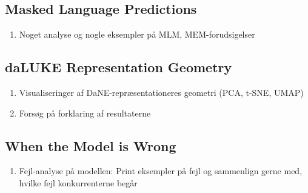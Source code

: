 \documentclass[main.tex]{subfiles}
\begin{document}
\subsection{Masked Language Predictions}
\begin{enumerate}
    \item Noget analyse og nogle eksempler på MLM, MEM-forudsigelser
\end{enumerate}

\subsection{daLUKE Representation Geometry}

\begin{enumerate}
    \item Visualiseringer af DaNE-repræsentationeres geometri (PCA, t-SNE, UMAP)
    \item Forsøg på forklaring af resultaterne
\end{enumerate}

\subsection{When the Model is Wrong}

\begin{enumerate}
    \item Fejl-analyse på modellen: Print eksempler på fejl og sammenlign gerne med, hvilke fejl konkurrenterne begår
\end{enumerate}
\end{document}
